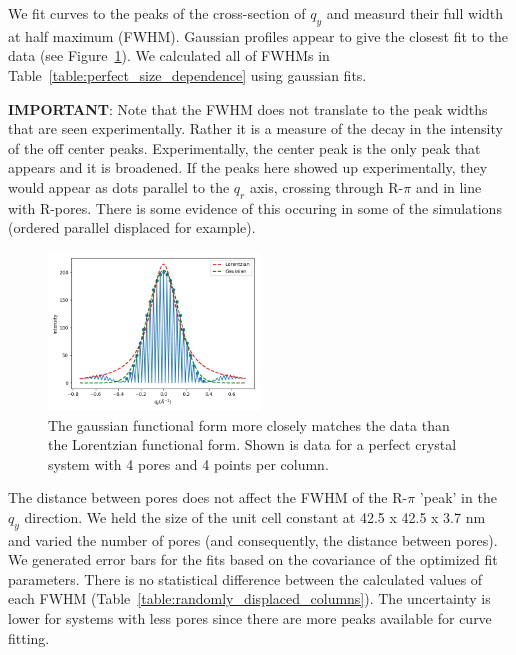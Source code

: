 \documentclass{article}
\begin{document}
  We fit curves to the peaks of the cross-section of $q_y$ and measurd their
  full width at half maximum (FWHM). Gaussian profiles appear to give the closest
  fit to the data (see Figure~\ref{fig:fwhm_fits}). We calculated all of FWHMs in
  Table~\ref{table:perfect_size_dependence} using gaussian fits.

  \textbf{IMPORTANT}: Note that the FWHM does not translate to the peak widths
  that are seen experimentally. Rather it is a measure of the decay in the
  intensity of the off center peaks. Experimentally, the center peak is the only
  peak that appears and it is broadened. If the peaks here showed up
  experimentally, they would appear as dots parallel to the $q_r$ axis, crossing
  through R-$\pi$ and in line with R-pores. There is some evidence of this
  occuring in some of the simulations (ordered parallel displaced for example).

  \begin{figure}[!htb]
  \centering
  \includegraphics[width=0.5\textwidth]{fwhm_fits.png}
  \caption{The gaussian functional form more closely matches the data than the Lorentzian
  functional form. Shown is data for a perfect crystal system with 4 pores and 4 points
  per column.}\label{fig:fwhm_fits}
  \end{figure}

  The distance between pores does not affect the FWHM of the R-$\pi$ 'peak' in
  the $q_y$ direction.  We held the size of the unit cell constant at 42.5 x 42.5
  x 3.7 nm and varied the number of pores (and consequently, the distance between
  pores). We generated error bars for the fits based on the covariance of the
  optimized fit parameters. There is no statistical difference between the
  calculated values of each FWHM (Table~\ref{table:randomly_displaced_columns}).
  The uncertainty is lower for systems with less pores since there are more
  peaks available for curve fitting. 
\end{document}
